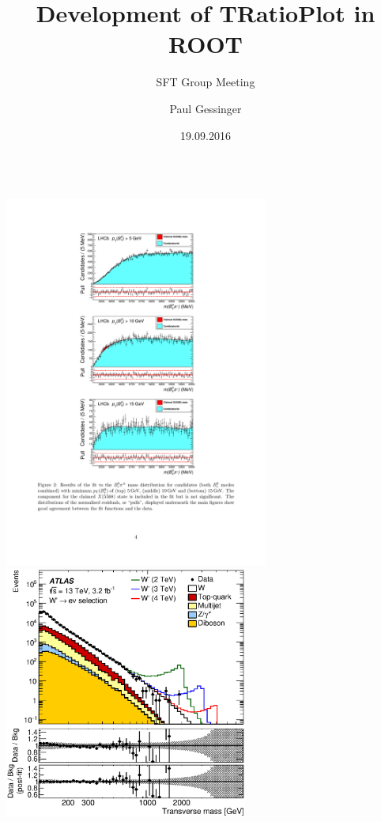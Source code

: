 \documentclass{beamer}
\title{Development of TRatioPlot in ROOT}
\subtitle{SFT Group  Meeting}
\author{Paul Gessinger}
\institute{Johannes Gutenberg University Mainz  \\ \vspace*{.3cm}\tiny{Supervisors:} \\ \small Olivier Couet \\ Lorenzo Moneta }
\date{19.09.2016}
\begin{document}

\begin{frame}
 	\titlepage
\end{frame}


\begin{frame}{}

   \begin{columns}
    \hspace*{-1.75cm}
      \centering
      \includegraphics[width=0.65\textwidth]{assets/lhcb_ratio.pdf}
      \vspace*{-0.2cm}
      \tiny{\cite{Aaij:2016iev}} \\
      \includegraphics[width=0.6\textwidth]{assets/lmet.eps}

\end{columns}
\end{frame}
\end{document}
